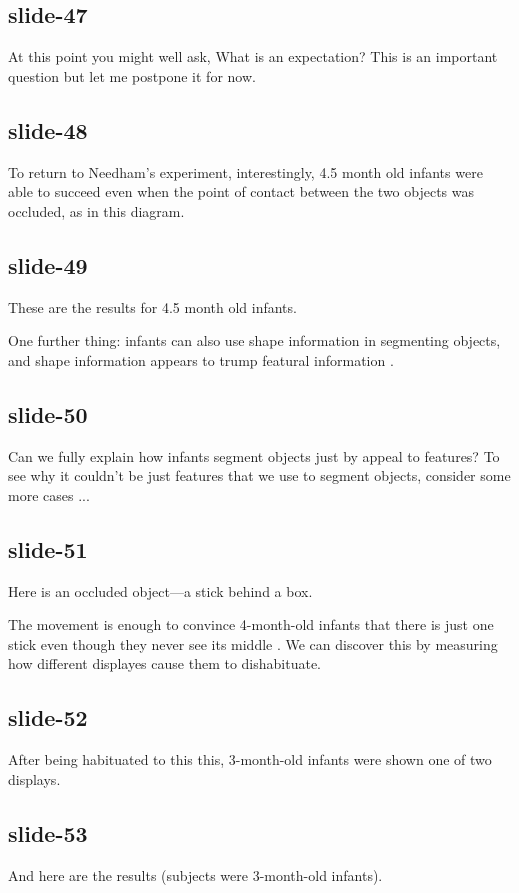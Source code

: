 \documentclass[12pt,\papersize]{extarticle}
\begin{document}
\subsection{slide-47}
At this point you might well ask, What is an expectation?
This is an important question but let me postpone it for now.
 
\subsection{slide-48}
To return to Needham's experiment, interestingly, 4.5 month old infants were able to succeed 
even when the point of contact between the two objects was occluded, as in this diagram.
 
\subsection{slide-49}
These are the results for 4.5 month old infants.
 
One further thing: infants can also use shape information in segmenting objects, and shape information appears to trump featural information \citep{needham:1999_role}.
 
\subsection{slide-50}
Can we fully explain how infants segment objects just by appeal to features?
To see why it couldn't be just features that we use to segment objects, consider 
some more cases ...
 
\subsection{slide-51}
Here is an occluded object---a stick behind a box.
 
The movement is enough to convince 4-month-old infants that there is just one stick even 
though they never see its middle \citep{kellman:1983_perception}.
We can discover this by measuring how different displayes cause them to dishabituate.
 
\subsection{slide-52}
After being habituated to this this, 3-month-old infants were shown one of two displays.
 
\subsection{slide-53}
And here are the results (subjects were 3-month-old infants).
 
\end{document}
